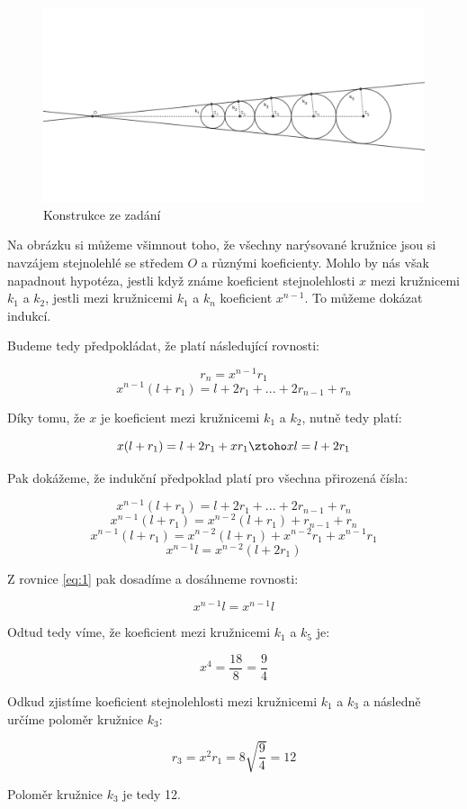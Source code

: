 \documentclass{fkssolpub}
\author{Ondřej Sedláček}
\begin{document}
\begin{figure}[h!]
	\centering
	\includegraphics[width=\textwidth]{3-fig.png}
	\caption{Konstrukce ze zadání}
\end{figure}

Na obrázku si můžeme všimnout toho, že všechny narýsované kružnice
jsou si navzájem stejnolehlé se středem $O$ a různými koeficienty.
Mohlo by nás však napadnout hypotéza, jestli když známe koeficient
stejnolehlosti $x$ mezi kružnicemi $k_1$ a $k_2$, jestli mezi
kružnicemi $k_1$ a $k_n$ koeficient $x^{n - 1}$. To můžeme
dokázat indukcí.

Budeme tedy předpokládat, že platí následující rovnosti:

\[
	r_n = x^{n - 1} r_1
\]
\[
	x^{n - 1}(l + r_1) = l + 2r_1 + ... + 2r_{n - 1} + r_n
\]

Díky tomu, že $x$ je koeficient mezi kružnicemi $k_1$ a $k_2$,
nutně tedy platí:

\begin{equation}
	x (l + r_1) = l + 2r_1 + x r_1 \ztoho xl = l + 2r_1
	\label{eq:1}
\end{equation}

Pak dokážeme, že indukční předpoklad platí pro všechna
přirozená čísla:

\[
	x^{n - 1}(l + r_1) = l + 2r_1 + ... + 2r_{n - 1} + r_n
\]
\[
	x^{n - 1}(l + r_1) = x^{n - 2}(l + r_1) + r_{n - 1} + r_n
\]
\[
	x^{n - 1}(l + r_1) = x^{n - 2}(l + r_1) + x^{n - 2}r_1 + x^{n - 1}r_1
\]
\[
	x^{n - 1} l = x^{n - 2}(l + 2r_1)
\]

Z rovnice \ref{eq:1} pak dosadíme a dosáhneme rovnosti:

\[
	x^{n - 1} l = x^{n - 1} l
\]

Odtud tedy víme, že koeficient mezi kružnicemi $k_1$ a $k_5$ je:

\[
	x^4 = \frac{18}{8} = \frac{9}{4}
\]

Odkud zjistíme koeficient stejnolehlosti mezi kružnicemi $k_1$ a
$k_3$ a následně určíme poloměr kružnice $k_3$:

\[
	r_3 = x^2 r_1 = 8 \sqrt{\frac{9}{4}} = 12
\]

Poloměr kružnice $k_3$ je tedy 12.
\end{document}
